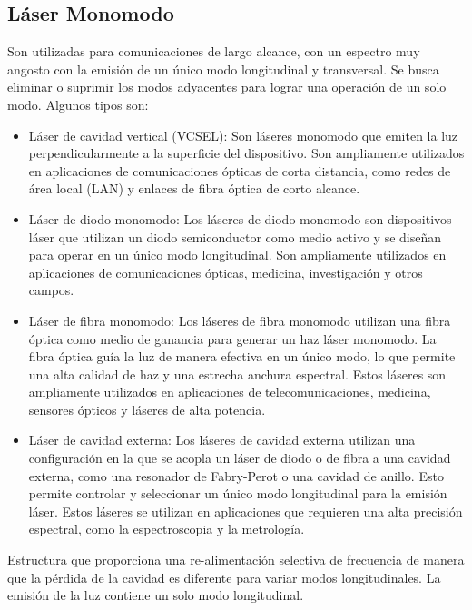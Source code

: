 \documentclass[12pt,fleqn,a4paper,oneside]{LegrandOrangeBook}
\begin{document}
\subsection{Láser Monomodo}
Son utilizadas para comunicaciones de largo alcance, con un espectro muy angosto con la emisión de un único modo longitudinal y transversal. Se busca eliminar o suprimir los modos adyacentes para lograr una operación de un solo modo. Algunos tipos son:
\begin{itemize}
\item Láser de cavidad vertical (VCSEL): Son láseres monomodo que emiten la luz perpendicularmente a la superficie del dispositivo. Son ampliamente utilizados en aplicaciones de comunicaciones ópticas de corta distancia, como redes de área local (LAN) y enlaces de fibra óptica de corto alcance.
\item Láser de diodo monomodo: Los láseres de diodo monomodo son dispositivos láser que utilizan un diodo semiconductor como medio activo y se diseñan para operar en un único modo longitudinal. Son ampliamente utilizados en aplicaciones de comunicaciones ópticas, medicina, investigación y otros campos.
\item Láser de fibra monomodo: Los láseres de fibra monomodo utilizan una fibra óptica como medio de ganancia para generar un haz láser monomodo. La fibra óptica guía la luz de manera efectiva en un único modo, lo que permite una alta calidad de haz y una estrecha anchura espectral. Estos láseres son ampliamente utilizados en aplicaciones de telecomunicaciones, medicina, sensores ópticos y láseres de alta potencia.
\item Láser de cavidad externa: Los láseres de cavidad externa utilizan una configuración en la que se acopla un láser de diodo o de fibra a una cavidad externa, como una resonador de Fabry-Perot o una cavidad de anillo. Esto permite controlar y seleccionar un único modo longitudinal para la emisión láser. Estos láseres se utilizan en aplicaciones que requieren una alta precisión espectral, como la espectroscopia y la metrología.
\end{itemize}
Estructura que proporciona una re-alimentación selectiva de frecuencia de manera que la pérdida de la cavidad es diferente para variar modos longitudinales. La emisión de la luz contiene un solo modo longitudinal.
\end{document}
